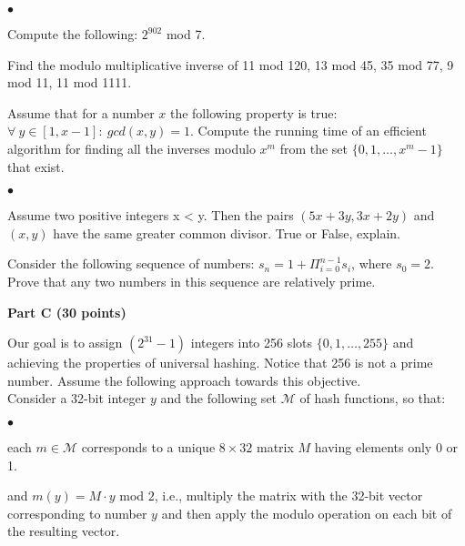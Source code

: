 \documentclass{article}
\newenvironment{myitem}{\begin{list}{$\bullet$}
{\setlength{\itemsep}{-0pt}
\setlength{\topsep}{0pt}
\setlength{\labelwidth}{0pt}
\setlength{\leftmargin}{10pt}
\setlength{\parsep}{-0pt}
\setlength{\itemsep}{0pt}
\setlength{\partopsep}{0pt}}}%
{\end{list}}
\begin{document}
\begin{myitem}
\item Compute the following: $2^{902}$ mod 7.\\
\item Find the modulo multiplicative inverse of 11 mod 120, 13 mod 45,
  35 mod 77, 9 mod 11, 11 mod 1111.\\
\item Assume that for a number $x$ the following property is true:
  $\forall\ y \in [1,x-1]:\ gcd(x,y) = 1$. Compute the running time of
  an efficient algorithm for finding all the inverses modulo $x^m$
  from the set $\{0, 1, \ldots, x^m-1\}$ that exist.\\
\end{myitem}

\begin{myitem}
\item Assume two positive integers x < y. Then the pairs
  $(5x+3y,3x+2y)$ and $(x,y)$ have the same greater common
  divisor. True or False, explain.\\

\item Consider the following sequence of numbers: $s_n = 1 +
  \Pi_{i=0}^{n-1} s_i$, where $s_0 = 2$. Prove that any two numbers in
  this sequence are relatively prime.\\
\end{myitem}

\begin{center}
{\bf Part C (30 points)}
\end{center}

 Our goal is to assign $(2^{31}-1)$ integers
into 256 slots $\{0,1, \dots, 255\}$ and achieving the properties of
universal hashing. Notice that 256 is not a prime number. Assume the
following approach towards this objective.\\

\noindent Consider a 32-bit integer $y$ and the following set $\mathcal{M}$ of
hash functions, so that:
\begin{myitem}
\item each $m \in \mathcal{M}$ corresponds to a unique $8 \times 32$
  matrix $M$ having elements only 0 or 1.
\item and $m(y) = M \cdot y$ mod $2$, i.e., multiply the matrix with
  the 32-bit vector corresponding to number $y$ and then apply the
  modulo operation on each bit of the resulting vector.\\
\end{myitem}
\end{document}
